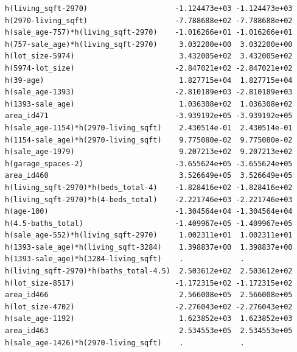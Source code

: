 \documentclass[
]{article}
\begin{document}
\begin{verbatim}
h(living_sqft-2970)                    -1.124473e+03 -1.124473e+03
h(2970-living_sqft)                    -7.788688e+02 -7.788688e+02
h(sale_age-757)*h(living_sqft-2970)    -1.016266e+01 -1.016266e+01
h(757-sale_age)*h(living_sqft-2970)     3.032200e+00  3.032200e+00
h(lot_size-5974)                        3.432005e+02  3.432005e+02
h(5974-lot_size)                       -2.847021e+02 -2.847021e+02
h(39-age)                               1.827715e+04  1.827715e+04
h(sale_age-1393)                       -2.810189e+03 -2.810189e+03
h(1393-sale_age)                        1.036308e+02  1.036308e+02
area_id471                             -3.939192e+05 -3.939192e+05
h(sale_age-1154)*h(2970-living_sqft)    2.430514e-01  2.430514e-01
h(1154-sale_age)*h(2970-living_sqft)    9.775080e-02  9.775080e-02
h(sale_age-1979)                        9.207213e+02  9.207213e+02
h(garage_spaces-2)                     -3.655624e+05 -3.655624e+05
area_id460                              3.526649e+05  3.526649e+05
h(living_sqft-2970)*h(beds_total-4)    -1.828416e+02 -1.828416e+02
h(living_sqft-2970)*h(4-beds_total)    -2.221746e+03 -2.221746e+03
h(age-100)                             -1.304564e+04 -1.304564e+04
h(4.5-baths_total)                     -1.409967e+05 -1.409967e+05
h(sale_age-552)*h(living_sqft-2970)     1.002311e+01  1.002311e+01
h(1393-sale_age)*h(living_sqft-3284)    1.398837e+00  1.398837e+00
h(1393-sale_age)*h(3284-living_sqft)    .             .           
h(living_sqft-2970)*h(baths_total-4.5)  2.503612e+02  2.503612e+02
h(lot_size-8517)                       -1.172315e+02 -1.172315e+02
area_id466                              2.566008e+05  2.566008e+05
h(lot_size-4702)                       -2.276043e+02 -2.276043e+02
h(sale_age-1192)                        1.623852e+03  1.623852e+03
area_id463                              2.534553e+05  2.534553e+05
h(sale_age-1426)*h(2970-living_sqft)    .             .           
                                                                  

\end{verbatim}
\end{document}

